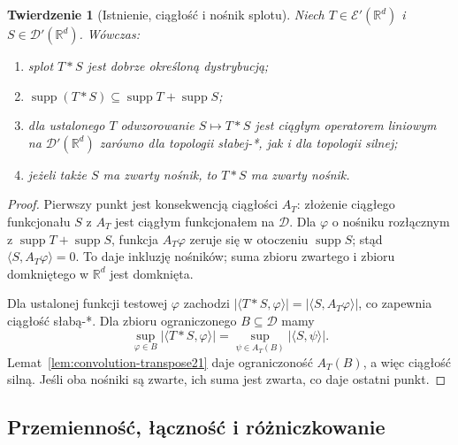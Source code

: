 \documentclass[11pt,a4paper]{article}
\numberwithin{equation}{section}
\theoremstyle{plain}
\newtheorem{twierdzenie}{Twierdzenie}[section]
\theoremstyle{definition}
\theoremstyle{remark}
\newcommand{\R}{\mathbb R}
\DeclareMathOperator{\supp}{supp}
\begin{document}
\begin{twierdzenie}[Istnienie, ciągłość i nośnik splotu]
\label{thm:convolution-properties21}
Niech $T\in\mathcal E'(\R^d)$ i
$S\in\mathcal D'(\R^d)$. Wówczas:
\begin{enumerate}
\item splot $T*S$ jest dobrze określoną dystrybucją;
\item $\supp(T*S)\subseteq\supp T+\supp S$;
\item dla ustalonego $T$ odwzorowanie
$S\mapsto T*S$ jest ciągłym operatorem liniowym na
$\mathcal D'(\R^d)$ zarówno dla topologii słabej-*, jak
i dla topologii silnej;
\item jeżeli także $S$ ma zwarty nośnik, to $T*S$ ma
zwarty nośnik.
\end{enumerate}
\end{twierdzenie}
\begin{proof}
Pierwszy punkt jest konsekwencją ciągłości $A_T$:
złożenie ciągłego funkcjonału $S$ z $A_T$ jest ciągłym
funkcjonałem na $\mathcal D$. Dla $\varphi$ o nośniku
rozłącznym z $\supp T+\supp S$, funkcja
$A_T\varphi$ zeruje się w otoczeniu $\supp S$;
stąd $\langle S,A_T\varphi\rangle=0$.
To daje inkluzję nośników; suma zbioru zwartego i zbioru
domkniętego w $\R^d$ jest domknięta.

Dla ustalonej funkcji testowej $\varphi$ zachodzi
$|\langle T*S,\varphi\rangle|=
|\langle S,A_T\varphi\rangle|$, co zapewnia
ciągłość słabą-*. Dla zbioru ograniczonego
$B\subseteq\mathcal D$ mamy
\[
 \sup_{\varphi\in B}|\langle T*S,\varphi\rangle|
 =\sup_{\psi\in A_T(B)}|\langle S,\psi\rangle|.
\]
Lemat~\ref{lem:convolution-transpose21} daje
ograniczoność $A_T(B)$, a więc ciągłość silną.
Jeśli oba nośniki są zwarte, ich suma jest zwarta,
co daje ostatni punkt.
\end{proof}

\subsection{Przemienność, łączność i różniczkowanie}
\end{document}
